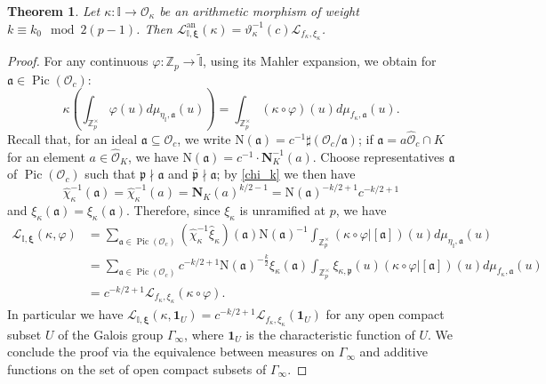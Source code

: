 \documentclass[10pt,a4paper]{amsart}
\newtheorem{theorem}{Theorem}
\newcommand{\I}{\mathbb{I}}
\DeclareMathOperator{\Pic}{Pic}
\newcommand{\Z}{\mathbb{Z}}
\begin{document}
\begin{theorem}\label{mainthh}
Let $\kappa\colon\I\rightarrow\mathcal{O}_\kappa$ be an arithmetic morphism of weight $k \equiv k_0 \mod 2(p-1)$. 
Then 
$\mathscr{L}_{\I,\boldsymbol\xi}^{\mathrm{an}}(\kappa )=
\vartheta^{-1}_\kappa (c) \mathscr{L}_{f_\kappa ,\xi_\kappa }$.
\end{theorem}

\begin{proof} 
For any continuous $\varphi\colon \Z_p \to \widetilde{\I}$, using its Mahler expansion, we obtain for $\mathfrak{a} \in \Pic(\mathcal{O}_c)$:
\[
\kappa \left(\int_{\Z_p^\times} \varphi(u) d{\mu_{\eta_\I,\mathfrak{a}}}(u)\right) = \int_{\Z_p^\times}(\kappa  \circ \varphi)(u) d{\mu_{f_\kappa ,\mathfrak{a}}}(u).
\]
Recall that, for an ideal $\mathfrak{a}\subseteq\mathcal{O}_c$, we write $\mathrm{N}(\mathfrak{a})=c^{-1}\sharp(\mathcal{O}_c/\mathfrak{a})$; if $\mathfrak{a}=a\widehat{\mathcal{O}}_c\cap K$ for an element $a\in\widehat{\mathcal{O}}_K$,
we have 
$\mathrm{N}(\mathfrak{a})=c^{-1}\cdot\mathbf{N}^{-1}_K(a)$.  
Choose representatives $\mathfrak{a}$ of  $\Pic(\mathcal{O}_c)$ such that 
$\mathfrak{p}\nmid \mathfrak{a}$
and $\bar{\mathfrak{p}}\nmid \mathfrak{a}$; by \eqref{chi_k} we then have  
\[
\hat{\chi}^{-1}_\kappa (\mathfrak{a})= \hat{\chi}^{-1}_\kappa(a) = \mathbf{N}_K(a)^{k /2-1} = \mathrm{N}(\mathfrak{a})^{-k /2+1} c^{-k/2+1}
\]
and $\xi_\kappa(\mathfrak{a})=\hat{\xi}_\kappa(\mathfrak{a})$. 
Therefore, since $\xi_\kappa$ is unramified at $p$, we have 
	\begin{equation*}
	\begin{split}
\mathscr{L}_{\I,\boldsymbol\xi}(\kappa,\varphi) &= \sum_{\mathfrak{a} \in \Pic(\mathcal O_{c})}
({\hat{\chi}}_\kappa ^{-1}
{\hat{\xi}}_\kappa )(\mathfrak{a})
\mathrm{N}(\mathfrak{a})^{-1}
\int_{\Z_p^{\times}}
(\kappa\circ\varphi \big|[\mathfrak{a}])(u)d\mu_{\eta_\I,\mathfrak{a}}(u)\\
&= \sum_{\mathfrak{a} \in \Pic(\mathcal{O}_{c})}c^{-k/2+1} \mathrm{N}(\mathfrak{a})^{-\frac{k}{2}}{\xi}_\kappa (\mathfrak{a}) \int_{\Z_p^{\times}} \xi_{\kappa ,\mathfrak{p}}(u)(\kappa  \circ \varphi \big|[\mathfrak{a}])(u)d\mu_{f_\kappa ,\mathfrak{a}}(u)
\\
&=c^{-k/2+1} \mathscr{L}_{f_\kappa ,\xi_\kappa}(\kappa \circ \varphi).
\end{split}
\end{equation*}
In particular we have 
$\mathscr{L}_{\I,\boldsymbol\xi}(\kappa ,\mathbf{1}_U) = c^{-k /2+1} \mathscr{L}
_{f_\kappa ,\xi_\kappa }(\mathbf{1}_U)$
for any open compact subset $U$ of the Galois group  $\Gamma_\infty$, where $\mathbf{1}_U$ is the characteristic function of $U$. We conclude the proof via the equivalence between measures on $\Gamma_\infty$ and additive functions on the set of open compact subsets of $\Gamma_\infty$.
\end{proof}
\end{document}
